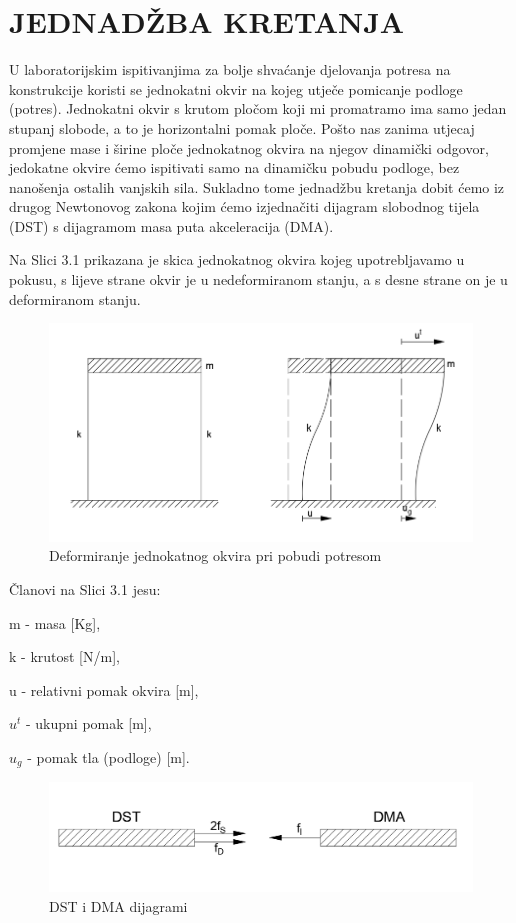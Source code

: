 \documentclass[12pt]{book}
\begin{document}
\chapter{\uppercase{Jednad\v{z}ba kretanja}}
U laboratorijskim ispitivanjima za bolje shvaćanje djelovanja potresa na konstrukcije koristi se jednokatni okvir na kojeg utječe pomicanje podloge (potres). Jednokatni okvir s krutom pločom koji mi promatramo ima samo jedan stupanj slobode, a to je horizontalni pomak ploče. Pošto nas zanima utjecaj promjene mase i širine ploče jednokatnog okvira na njegov dinamički odgovor, jedokatne okvire ćemo ispitivati samo na dinamičku pobudu podloge, bez nanošenja ostalih vanjskih sila. Sukladno tome jednadžbu kretanja dobit ćemo iz drugog Newtonovog zakona kojim ćemo izjednačiti dijagram slobodnog tijela (DST) s dijagramom masa puta akceleracija (DMA). \cite{chopra2007} \cite{dinamika_ZG}


Na Slici 3.1 prikazana je skica jednokatnog okvira kojeg upotrebljavamo u pokusu, s lijeve strane okvir je u nedeformiranom stanju, a s desne strane on je u deformiranom stanju.

\begin{figure}[h]
	\centering
	\includegraphics[width=1\linewidth]{Slike/screenshot003}
	\caption{Deformiranje jednokatnog okvira pri pobudi potresom}
	\label{fig:screenshot004}
\end{figure}


\newpage

Članovi na Slici 3.1 jesu:

m - masa [Kg],

k - krutost [N/m],

u - relativni pomak okvira [m],

$u^t$ - ukupni pomak [m],

$u_g$ - pomak tla (podloge) [m].


\begin{figure}[h]
	\centering
	\includegraphics[width=1\linewidth]{Slike/screenshot002}
	\caption{DST i DMA dijagrami}
	\label{fig:screenshot002}
\end{figure}
\end{document}
